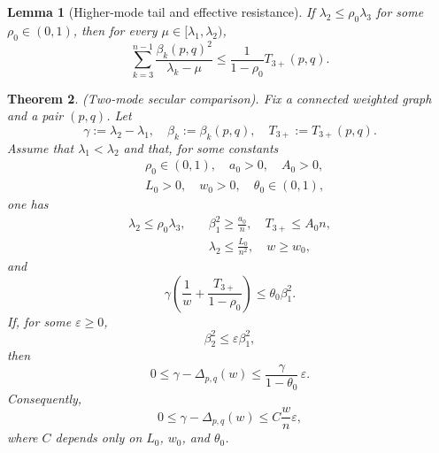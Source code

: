 \documentclass[11pt]{article}
\numberwithin{equation}{section}
\newtheorem{theorem}{Theorem}[section]
\newtheorem{lemma}[theorem]{Lemma}
\theoremstyle{definition}
\theoremstyle{remark}
\begin{document}
\begin{lemma}[Higher-mode tail and effective resistance]\label{lem:two_mode_resistance}
	If $\lambda_2\le \rho_0\lambda_3$ for some $\rho_0\in(0,1)$, then for
	every $\mu\in[\lambda_1,\lambda_2)$,
	\begin{equation}\label{eq:tail_resolvent_bound}
		\sum_{k=3}^{n-1}\frac{\beta_k(p,q)^2}{\lambda_k-\mu}
		\le \frac{1}{1-\rho_0}T_{3+}(p,q).
	\end{equation}
\end{lemma}


\begin{theorem}\label{thm:comparison_two_mode}
	\emph{(Two-mode secular comparison).}
	Fix a connected weighted graph and a pair $(p,q)$. Let
	\begin{equation*}
		\gamma:=\lambda_2-\lambda_1,
		\quad
		\beta_k:=\beta_k(p,q),
		\quad
		T_{3+}:=T_{3+}(p,q).
	\end{equation*}
	Assume that $\lambda_1<\lambda_2$ and that, for some constants
	\begin{equation*}
		\begin{split}
			&\rho_0\in(0,1),\quad a_0>0,\quad A_0>0,\\
			&L_0>0,\quad w_0>0,\quad \theta_0\in(0,1),
		\end{split}
	\end{equation*}
	one has
	\begin{equation}\label{eq:comparison_hyp1}
		\begin{split}
			\lambda_2\le \rho_0\lambda_3,
			\quad
			&\beta_1^2\ge \frac{a_0}{n},
			\quad
			T_{3+}\le A_0 n,\\
			&\lambda_2\le \frac{L_0}{n^2},
			\quad
			w\ge w_0,
		\end{split}
	\end{equation}
	and
	\begin{equation}\label{eq:comparison_dominance}
		\gamma\left(\frac1w+\frac{T_{3+}}{1-\rho_0}\right)
		\le \theta_0\beta_1^2.
	\end{equation}
	If, for some $\varepsilon\ge 0$,
	\begin{equation}\label{eq:comparison_small_beta2}
		\beta_2^2\le \varepsilon\beta_1^2,
	\end{equation}
	then
	\begin{equation}\label{eq:ceiling_deficit_gamma}
		0\le \gamma-\Delta_{p,q}(w)
		\le \frac{\gamma}{1-\theta_0}\,\varepsilon.
	\end{equation}
	Consequently,
	\begin{equation}\label{eq:ceiling_deficit_wn}
		0\le \gamma-\Delta_{p,q}(w)
		\le C\frac{w}{n}\varepsilon,
	\end{equation}
	where $C$ depends only on $L_0$, $w_0$, and $\theta_0$.
\end{theorem}
\end{document}
